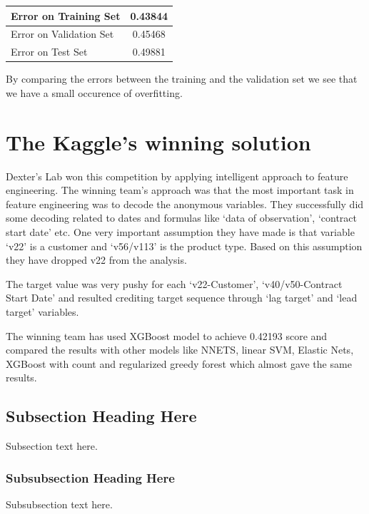 \documentclass[conference, onecolumn]{IEEEtran}
\begin{document}
\begin{center}
\begin{tabular}{ |l|c| } 
 \hline
Error on Training Set & 0.43844  \\ \hline
Error on Validation Set & 0.45468 \\ \hline
Error on Test Set & 0.49881\\ \hline
\end{tabular}
\end{center}
By comparing the errors between the training and the validation set we see that we have a small occurence of overfitting.

\section{The Kaggle's winning solution}
Dexter’s Lab won this competition by applying intelligent approach to feature engineering.  The winning team's approach was that the most important task in feature engineering was to decode the anonymous variables. They successfully did some decoding related to dates and formulas like ‘data of observation’, ‘contract start date’ etc. One very important assumption they have made is that variable ‘v22’ is a customer and ‘v56/v113’ is the product type. Based on this assumption they have dropped v22 from the analysis.

The target value was very pushy for each ‘v22-Customer’, ‘v40/v50-Contract Start Date’ and resulted crediting target sequence through ‘lag target’ and ‘lead target’ variables. 

The winning team has used XGBoost model to achieve 0.42193 score and compared the results with other models like NNETS, linear SVM, Elastic Nets, XGBoost with count and regularized greedy forest which almost gave the same results.


\subsection{Subsection Heading Here}
Subsection text here.


\subsubsection{Subsubsection Heading Here}
Subsubsection text here.
\end{document}
